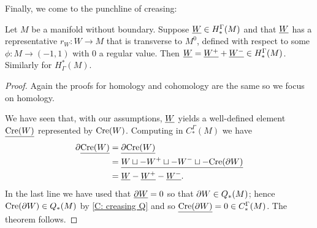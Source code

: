 Finally, we come to the punchline of creasing:

\begin{theorem}\label{T: cohomology creasing}
	Let $M$ be a manifold without boundary.
	Suppose $\underline{W} \in H_*^\Gamma(M)$ and that $\underline{W}$ has a representative $r_W \colon W \to M$ that is transverse to $M^0$, defined with respect to some $\phi \colon M \to (-1,1)$ with $0$ a regular value.
	Then $\underline{W} = \underline{W^+} + \underline{W^-} \in H_*^\Gamma(M)$.
	Similarly for $H^*_\Gamma(M)$.
\end{theorem}

\begin{proof}
	Again the proofs for homology and cohomology are the same so we focus on homology.

	We have seen that, with our assumptions, $\underline{W}$ yields a well-defined element $\underline{\mathrm{Cre}(W)}$ represented by $\mathrm{Cre}(W)$.
	Computing in $C_*^\Gamma(M)$ we have
	\begin{align*}
		\partial \underline{\mathrm{Cre}(W)}& = \underline{\partial \mathrm{Cre}(W) }\\
		& = \underline{W \sqcup -W^+ \sqcup -W^- \sqcup -\mathrm{Cre}(\partial W)}\\
		& = \underline{W} -\underline{W^+}-\underline{W^-}.
	\end{align*}
	In the last line we have used that $\underline{\partial W} = 0$ so that $\partial W \in Q_*(M)$; hence $\mathrm{Cre}(\partial W) \in Q_*(M)$ by \cref{C: creasing Q} and so $\underline{\mathrm{Cre}(\partial W)} = 0 \in C_*^\Gamma(M)$.
	The theorem follows.
\end{proof}

